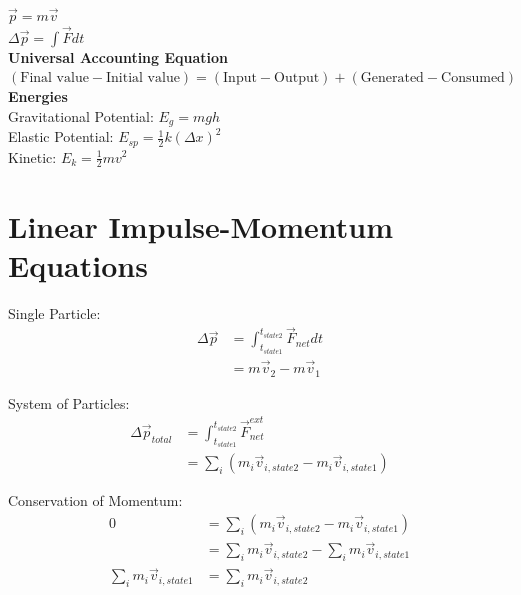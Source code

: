\documentclass{article}
\begin{document}
$\vec{p} = m \vec{v}$ \\
$\Delta \vec{p} = \int\vec{F}dt$ \\

\textbf{Universal Accounting Equation} \\
$(\text{Final value} - \text{Initial value}) = (\text{Input} - \text{Output}) + (\text{Generated} - \text{Consumed})$ \\

\textbf{Energies} \\
Gravitational Potential: $E_g = mgh$ \\
Elastic Potential: $E_{sp} = \frac{1}{2} k (\Delta x)^2$ \\
Kinetic: $E_k = \frac{1}{2}mv^2$ \\

\clearpage


\section*{Linear Impulse-Momentum Equations}
Single Particle:
\begin{align*}
    \Delta\vec{p} &= \int_{t_{state 1}}^{t_{state 2}} \vec{F}_{net} dt  \\
                  &= m\vec{v}_2 - m\vec{v}_1
\end{align*}

System of Particles: 
\begin{align*}
    \Delta\vec{p}_{total} &= \int_{t_{state 1}}^{t_{state 2}} \vec{F}_{net}^{ext} \\
                          &= \sum_i \left( m_i\vec{v}_{i, state 2} - m_i\vec{v}_{i, state 1} \right)
\end{align*}

Conservation of Momentum:
\begin{align*}
    0 &= \sum_i \left( m_i\vec{v}_{i, state 2} - m_i\vec{v}_{i, state 1} \right) \\
      &= \sum_i m_i\vec{v}_{i, state 2} - \sum_i m_i\vec{v}_{i, state 1} \\
    \sum_i m_i\vec{v}_{i, state 1} &= \sum_i m_i\vec{v}_{i, state 2}
\end{align*}

\clearpage

\end{document}
